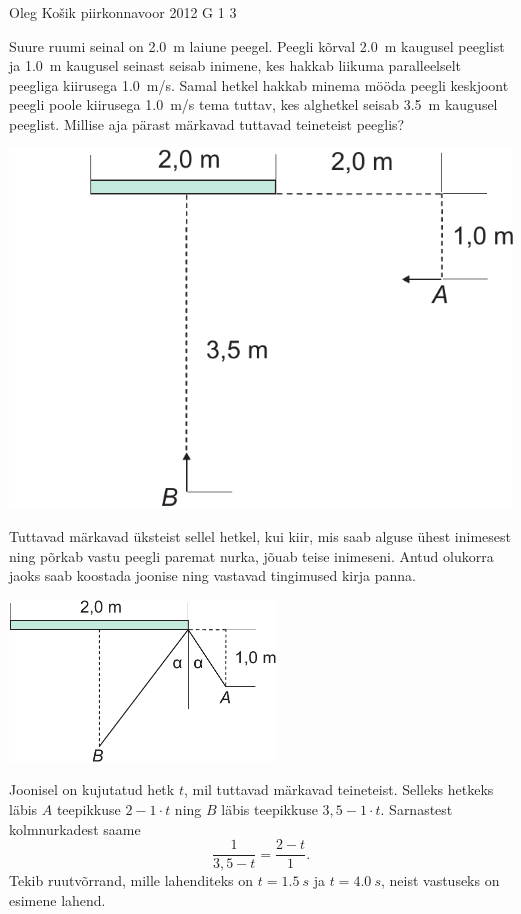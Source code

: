 {Oleg Košik} %
{piirkonnavoor} %
{2012} %
{G 1} %
{3} %
{
\ifStatement
Suure ruumi seinal on \SI{2,0}{m} laiune peegel. Peegli kõrval \SI{2,0}{m}
kaugusel peeglist ja \SI{1,0}{m} kaugusel seinast seisab inimene, kes hakkab
liikuma paralleelselt peegliga kiirusega \SI{1,0}{m/s}. Samal hetkel hakkab
minema mööda peegli keskjoont peegli poole kiirusega \SI{1,0}{m/s} tema tuttav,
kes alghetkel seisab \SI{3,5}{m} kaugusel peeglist. Millise aja pärast
märkavad tuttavad teineteist peeglis?

\begin{center}
\includegraphics[width=0.5\linewidth]{2012-v2g-01-peegel2}%
\end{center}
\fi


\ifHint
Tuttavad märkavad üksteist sellel hetkel, kui kiir, mis saab alguse ühest inimesest ning põrkab vastu peegli paremat nurka, jõuab teise inimeseni. Antud olukorra jaoks saab koostada joonise ning vastavad tingimused kirja panna.
\fi


\ifSolution
\begin{center}
\includegraphics[width=200pt]{2012-v2g-01-peegel_lah}
\end{center}

Joonisel on kujutatud hetk $t$, mil tuttavad märkavad teineteist. Selleks hetkeks läbis $A$ teepikkuse $2-1\cdot t$ ning $B$ läbis teepikkuse $3,5-1\cdot t$. Sarnastest kolmnurkadest saame
\[
\frac{1}{3,5-t}=\frac{2-t}{1}.
\]
Tekib ruutvõrrand, mille lahenditeks on $t=\SI{1,5}{s}$ ja $t=\SI{4,0}{s}$, neist vastuseks on esimene lahend.
\fi


}
